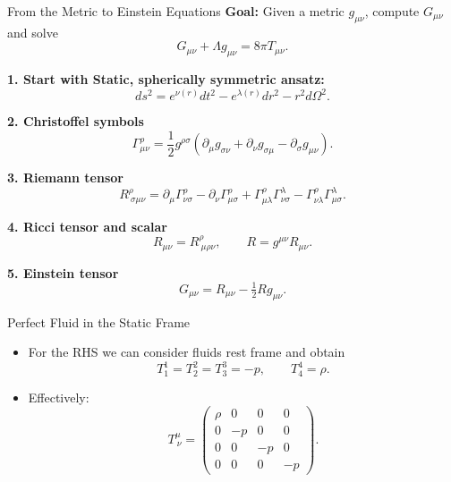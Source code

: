 \documentclass[11pt]{beamer}
\begin{document}
\begin{frame}{From the Metric to Einstein Equations}
  \textbf{Goal:} Given a metric $g_{\mu\nu}$, compute $G_{\mu\nu}$ and solve
  \[
    G_{\mu\nu} + \Lambda g_{\mu\nu} = 8\pi T_{\mu\nu}.
  \]

  \medskip
  \textbf{1. Start with Static, spherically symmetric ansatz:}
  \[
    ds^2 = e^{\nu(r)} dt^2 - e^{\lambda(r)} dr^2 - r^2 d\Omega^2.
  \]

  \textbf{2. Christoffel symbols}
  \[
    \Gamma^\rho_{\mu\nu}
    = \frac{1}{2} g^{\rho\sigma}
    \left( \partial_\mu g_{\sigma\nu}
         + \partial_\nu g_{\sigma\mu}
         - \partial_\sigma g_{\mu\nu} \right).
  \]

  \textbf{3. Riemann tensor}
  \[
    R^\rho_{\ \sigma\mu\nu}
    = \partial_\mu \Gamma^\rho_{\nu\sigma}
    - \partial_\nu \Gamma^\rho_{\mu\sigma}
    + \Gamma^\rho_{\mu\lambda}\Gamma^\lambda_{\nu\sigma}
    - \Gamma^\rho_{\nu\lambda}\Gamma^\lambda_{\mu\sigma}.
  \]

  \textbf{4. Ricci tensor and scalar}
  \[
    R_{\mu\nu} = R^\rho_{\ \mu\rho\nu},
    \qquad
    R = g^{\mu\nu} R_{\mu\nu}.
  \]

  \textbf{5. Einstein tensor}
  \[
    G_{\mu\nu} = R_{\mu\nu}
    - \tfrac{1}{2} R g_{\mu\nu}.
  \]
\end{frame}


\begin{frame}{Perfect Fluid in the Static Frame}
  \begin{itemize}
    \item For the RHS we can consider fluids rest frame and obtain
      \[
        T^1_1 = T^2_2 = T^3_3 = -p, \qquad T^4_4 = \rho.
      \]
    \item Effectively:
          \[
      T^\mu_{\ \nu} =
      \begin{pmatrix}
      \rho & 0 & 0 & 0 \\
      0 & -p & 0 & 0 \\
      0 & 0 & -p & 0 \\
      0 & 0 & 0 & -p
      \end{pmatrix}.
      \]

  \end{itemize}
\end{frame}
\end{document}
